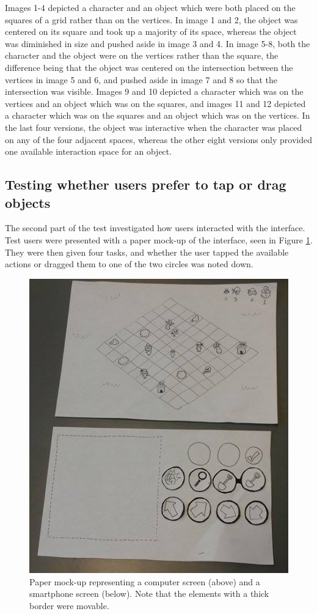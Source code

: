 Images 1-4 depicted a character and an object which were both placed on the squares of a grid rather than on the vertices. In image 1 and 2, the object was centered on its square and took up a majority of its space, whereas the object was diminished in size and pushed aside in image 3 and 4. In image 5-8, both the character and the object were on the vertices rather than the square, the difference being that the object was centered on the intersection between the vertices in image 5 and 6, and pushed aside in image 7 and 8 so that the intersection was visible. Images 9 and 10 depicted a character which was on the vertices and an object which was on the squares, and images 11 and 12 depicted a character which was on the squares and an object which was on the vertices. In the last four versions, the object was interactive when the character was placed on any of the four adjacent spaces, whereas the other eight versions only provided one available interaction space for an object.

\subsection{Testing whether users prefer to tap or drag objects}
The second part of the test investigated how users interacted with the interface. Test users were presented with a paper mock-up of the interface, seen in Figure \ref{fig:mockup}. They were then given four tasks, and whether the user tapped the available actions or dragged them to one of the two circles was noted down.

\begin{figure}[h!]
	\centering
	\includegraphics[scale=0.7]{figures/paper_1.jpg}
	\caption{Paper mock-up representing a computer screen (above) and a smartphone screen (below). Note that the elements with a thick border were movable. \label{fig:mockup}}
\end{figure}

